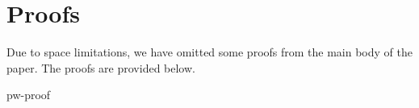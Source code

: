 \section{Proofs}
\label{app:proofs}

Due to space limitations, we have omitted some proofs from
the main body of the paper.  The proofs are provided below.

{pw-proof}

